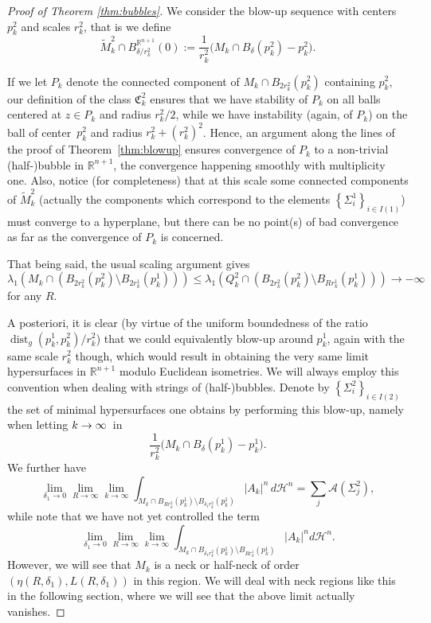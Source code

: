 \documentclass[10pt]{amsart}
\let\mathcal\mathscr
\DeclareMathOperator{\dist}{dist}
\theoremstyle{definition}
\newcommand{\R}{\mathbb{R}}
\newcommand{\h}{\mathscr{H}}
\begin{document}
\begin{proof}[Proof of Theorem \ref{thm:bubbles}]
We consider the blow-up sequence with centers $p^2_k$ and scales $r^2_k$, that is we define
\begin{equation*}
\widetilde{M}_k^2 \cap B^{\R^{n+1}}_{\delta/r^2_k}(0) := \frac{1}{r^2_k}\big(M_k\cap B_\delta(p^2_k)- p^2_k\big).
\end{equation*}

If we let $P_k$ denote the connected component of $M_k\cap B_{2r^2_k}(p^2_k)$ containing $p^2_k$, our definition of the class $\mathfrak{C}^2_k$ ensures that we have stability of $P_k$ on all balls centered at $z\in P_k$ and radius $r^2_k/2$, while we have instability (again, of $P_k$) on the ball of center~$p^2_k$ and radius $r^2_k+(r^2_k)^2$. Hence, an argument along the lines of the proof of Theorem~\ref{thm:blowup} ensures convergence of $P_k$ to a non-trivial (half-)bubble in $\R^{n+1}$, the convergence happening smoothly with multiplicity one. Also, notice (for completeness) that
at this scale some connected components of $\widetilde{M}_k^2$ (actually the components which correspond to the elements $\left\{\Sigma^1_i\right\}_{i\in I(1)}$) must converge to a hyperplane, but there can be no point(s) of bad convergence as far as the convergence of $P_k$ is concerned.

That being said, the usual scaling argument gives $$\lambda_1(M_k\cap(B_{2r^2_k}(p^2_k)\setminus B_{2r^1_k}(p^1_k)))\leq \lambda_1(Q^2_k\cap(B_{2r^2_k}(p^2_k)\setminus B_{Rr^1_k}(p^1_k)))\to -\infty$$ for any $R$.

A posteriori, it is clear (by virtue of the uniform boundedness of the ratio $\dist_g(p_k^1,p_k^2)/r^2_k$) that we could equivalently blow-up around $p^1_k$, again with the same scale $r^2_k$ though, which would result in obtaining the very same limit hypersurfaces in $\R^{n+1}$ modulo Euclidean isometries. We will always employ this convention when dealing with strings of (half-)bubbles.
Denote by $\left\{\Sigma^2_i \right\}_{i\in I(2)}$ the set of minimal hypersurfaces one obtains by performing this blow-up, namely when letting $k\to\nobreak\infty$~in
\[
\frac{1}{r^2_k}\big(M_k\cap B_\delta(p^1_k)- p^1_k\big).
\]
We further have
\begin{equation}\label{eq.secbubble2}
\lim_{\delta_1\to 0}\lim_{R\to \infty}\lim_{k\to \infty} \int_{M_k\cap B_{Rr^2_k}(p^1_k)\setminus B_{\delta_1 r^2_k}(p^1_k)} |A_k|^n \,d\h^n = \sum_j \mathcal{A}(\Sigma^2_j),
\end{equation}
while note that we have not yet controlled the term
\begin{equation}\label{eq.neck1}
\lim_{\delta_1\to 0}\lim_{R\to \infty}\lim_{k\to \infty}\int_{M_k\cap B_{\delta_1 r^2_k}(p^1_k)\setminus B_{Rr^1_k}(p^1_k)} |A_k|^n d \h^n.
\end{equation}
However, we will see that $M_k$ is a neck or half-neck of order $(\eta (R,\delta_1), L(R,\delta_1))$ in this region. We will deal with neck regions like this in the following section, where we will see that the above limit actually vanishes.


\end{proof}
\end{document}
